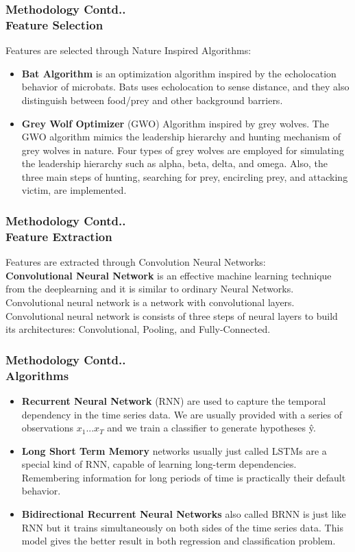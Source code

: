 \documentclass{beamer}
\begin{document}
\begin{frame}\frametitle{Methodology Contd..\\\footnotesize{Feature Selection}}
Features are selected through Nature Inspired Algorithms:
\begin{itemize}
    \item \textbf{Bat Algorithm} is an optimization algorithm inspired by the echolocation behavior of microbats. Bats uses echolocation to sense distance, and they also distinguish between food/prey and other background barriers.
    \item \textbf{Grey Wolf Optimizer} (GWO) Algorithm inspired by grey wolves. The GWO algorithm mimics the leadership hierarchy and hunting mechanism of grey wolves in nature. Four types of grey wolves are employed for simulating the leadership hierarchy such as alpha, beta, delta, and omega. Also, the three main steps of hunting, searching for prey, encircling prey, and attacking victim, are implemented.
\end{itemize}

\end{frame}


\begin{frame}\frametitle{Methodology Contd..\\\footnotesize{Feature Extraction}}
Features are extracted through Convolution Neural Networks:\\
\textbf{Convolutional Neural Network} is an effective machine learning technique from the deeplearning and it is similar to ordinary Neural Networks.  Convolutional neural network is  a network  with  convolutional  layers.   Convolutional  neural network  is  consists  of three steps of neural layers to build its architectures:  Convolutional, Pooling, and Fully-Connected.

\end{frame}

\begin{frame}\frametitle{Methodology Contd..\\\footnotesize{Algorithms}}
\begin{itemize}
    \item \textbf{Recurrent Neural Network} (RNN)  are used to capture the temporal dependency in the time series data. We are usually provided with a series of observations $x_1$...$x_T$ and we train a classifier to generate hypotheses \^y. 
    \item \textbf{Long Short Term Memory} networks usually just called LSTMs are a special kind of RNN, capable of learning long-term dependencies. Remembering information for long periods of time is practically their default behavior.
    \item \textbf{Bidirectional Recurrent Neural Networks} also called BRNN is just like RNN but it trains simultaneously on both sides of the time series data. This model gives the better result in both regression and classification problem.
\end{itemize}

\end{frame}
\end{document}
